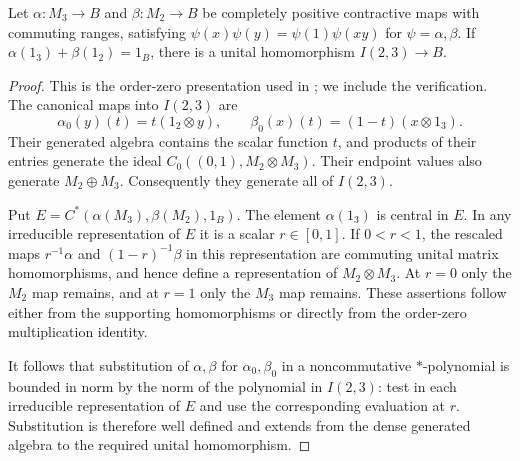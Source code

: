 \begin{lemma}\label{lem:rw-commuting-maps}
Let $\alpha:M_3\to B$ and $\beta:M_2\to B$ be completely positive
contractive maps with commuting ranges, satisfying
$\psi(x)\psi(y)=\psi(1)\psi(xy)$ for $\psi=\alpha,\beta$.
If
$\alpha(1_3)+\beta(1_2)=1_B$, there is a unital homomorphism
$I(2,3)\to B$.
\end{lemma}
\begin{proof}
This is the order-zero presentation used in
\cite[Proposition~2.5]{RW}; we include the verification.
The canonical maps into $I(2,3)$ are
\[
 \alpha_0(y)(t)=t(1_2\otimes y),\qquad
 \beta_0(x)(t)=(1-t)(x\otimes1_3).
\]
Their generated algebra contains the scalar function $t$, and products
of their entries generate the ideal $C_0((0,1),M_2\otimes M_3)$.
Their endpoint values also generate $M_2\oplus M_3$. Consequently
they generate all of $I(2,3)$.

Put $E=C^*(\alpha(M_3),\beta(M_2),1_B)$. The element
$\alpha(1_3)$ is central in $E$. In any irreducible representation
of $E$ it is a scalar $r\in[0,1]$. If $0<r<1$, the rescaled maps
$r^{-1}\alpha$ and $(1-r)^{-1}\beta$ in this representation are
commuting unital matrix homomorphisms, and hence define a representation
of $M_2\otimes M_3$. At $r=0$ only the $M_2$ map remains, and at
$r=1$ only the $M_3$ map remains. These assertions follow either from
the supporting homomorphisms or directly from the order-zero
multiplication identity.

It follows that substitution of $\alpha,\beta$ for
$\alpha_0,\beta_0$ in a noncommutative $*$-polynomial is bounded in
norm by the norm of the polynomial in $I(2,3)$: test in each
irreducible representation of $E$ and use the corresponding evaluation
at $r$. Substitution is therefore well defined and extends from the
dense generated algebra to the required unital homomorphism.
\end{proof}

